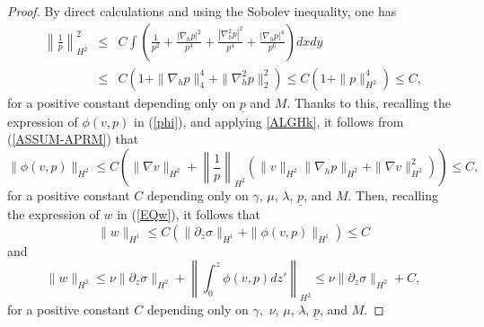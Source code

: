 \documentclass[12pt,reqno]{amsart}
\numberwithin{equation}{section}
\begin{document}
\begin{proof}
By direct calculations and using the Sobolev inequality, one has
\begin{eqnarray}
  \left\|\frac1p\right\|_{H^2}^2&\leq&C\int\left(\frac{1}{p^2}+\frac{|\nabla_hp|^2}{p^4}+\frac{|\nabla_h^2p|^2}{p^4}+\frac{|\nabla_hp|^4}{p^6}
  \right)dxdy\nonumber\\
  &\leq& C(1+\|\nabla_hp\|_4^4+\|\nabla_h^2p\|_2^2)\leq C(1+\|p\|_{H^2}^4)\leq C,\label{H21P}
\end{eqnarray}
for a positive constant depending only on $\underline p$ and $M$. Thanks to this,
recalling the expression of $\phi(v,p)$ in (\ref{phi}), and applying \eqref{ALGHk}, it follows from
(\ref{ASSUM-APRM}) that
\begin{equation}
  \|\phi(v,p)\|_{H^2}\leq C\left(\|\nabla v\|_{H^2}+\left\|\frac1p\right\|_{H^2}(\|v\|_{H^2}\|\nabla_hp\|_{H^2}+\|\nabla v\|_{H^2}^2)\right)
  \leq C,\label{H2phi}
\end{equation}
for a positive constant $C$ depending only on $\gamma$, $\mu$, $\lambda$, $\underline p$, and $M$. Then, recalling the expression of $w$ in (\ref{EQw}), it follows that
\begin{equation}
  \label{H1w}
  \|w\|_{H^1}\leq C(\|\partial_z\sigma\|_{H^1}+\|\phi(v,p)\|_{H^1}) \leq C
\end{equation}
and
\begin{equation}
  \label{H2w}
  \|w\|_{H^2}\leq\nu\|\partial_z\sigma\|_{H^2}+\left\|\int_0^z\phi(v,p)dz'\right\|_{H^2}\leq\nu\|\partial_z\sigma\|_{H^2}+C,
\end{equation}
for a positive constant $C$ depending only on $\gamma,$ $\nu$, $\mu$, $\lambda$, $\underline p$, and $M$.


\end{proof}
\end{document}
